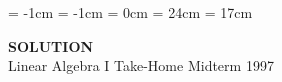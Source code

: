 
\topmargin = -1cm
\oddsidemargin = -1cm \evensidemargin = 0cm
\textheight = 24cm \textwidth = 17cm %

\newcommand{\note}{\vspace{2ex}\noindent{\gt 注\quad}}
\newcommand{\proof}{{\gt 証明\quad}}
\newcommand{\sol}{{\gt 解．\quad}}
\newcommand{\qed}{\hfill\hbox{\rule{6pt}{6pt}}}
\newcommand{\ba}{\mbox{\boldmath $a$}}
\newcommand{\bb}{\mbox{\boldmath $b$}}
\newcommand{\bd}{\mbox{\boldmath $d$}}
\newcommand{\be}{\mbox{\boldmath $e$}}
\newcommand{\bu}{\mbox{\boldmath $u$}}
\newcommand{\bv}{\mbox{\boldmath $v$}}
\newcommand{\bw}{\mbox{\boldmath $w$}}
\newcommand{\bx}{\mbox{\boldmath $x$}}
\newcommand{\by}{\mbox{\boldmath $y$}}
\newcommand{\bo}{\mbox{\boldmath $0$}}



\begin{center}
{\bf\LARGE SOLUTION}\\
{\large Linear Algebra I Take-Home Midterm 1997}
\end{center}


